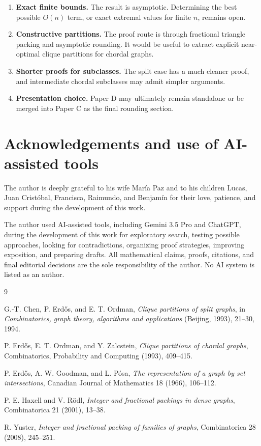 \documentclass[11pt]{article}
\theoremstyle{definition}
\begin{document}
\begin{enumerate}[label=(\roman*)]
    \item \textbf{Exact finite bounds.} The result is asymptotic. Determining the best possible \(O(n)\) term, or exact extremal values for finite \(n\), remains open.
    \item \textbf{Constructive partitions.} The proof route is through fractional triangle packing and asymptotic rounding. It would be useful to extract explicit near-optimal clique partitions for chordal graphs.
    \item \textbf{Shorter proofs for subclasses.} The split case has a much cleaner proof, and intermediate chordal subclasses may admit simpler arguments.
    \item \textbf{Presentation choice.} Paper D may ultimately remain standalone or be merged into Paper C as the final rounding section.
\end{enumerate}

\section*{Acknowledgements and use of AI-assisted tools}

The author is deeply grateful to his wife María Paz and to his children Lucas, Juan Cristóbal, Francisca, Raimundo, and Benjamín for their love, patience, and support during the development of this work.

The author used AI-assisted tools, including Gemini 3.5 Pro and ChatGPT, during the development of this work for exploratory search, testing possible approaches, looking for contradictions, organizing proof strategies, improving exposition, and preparing drafts. All mathematical claims, proofs, citations, and final editorial decisions are the sole responsibility of the author. No AI system is listed as an author.

\begin{thebibliography}{9}

G.-T. Chen, P. Erdős, and E. T. Ordman,
\emph{Clique partitions of split graphs},
in \emph{Combinatorics, graph theory, algorithms and applications} (Beijing, 1993), 21--30, 1994.

P. Erdős, E. T. Ordman, and Y. Zalcstein,
\emph{Clique partitions of chordal graphs},
Combinatorics, Probability and Computing (1993), 409--415.

P. Erdős, A. W. Goodman, and L. Pósa,
\emph{The representation of a graph by set intersections},
Canadian Journal of Mathematics 18 (1966), 106--112.

P. E. Haxell and V. Rödl,
\emph{Integer and fractional packings in dense graphs},
Combinatorica 21 (2001), 13--38.

R. Yuster,
\emph{Integer and fractional packing of families of graphs},
Combinatorica 28 (2008), 245--251.

\end{thebibliography}
\end{document}
